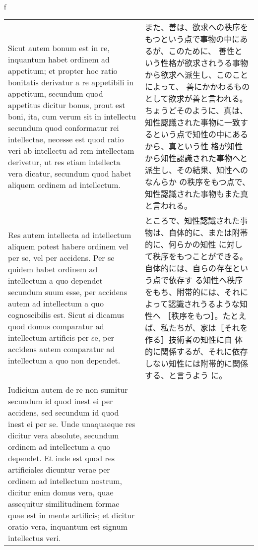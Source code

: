 \\f\documentclass[10pt]{jsarticle} %
\begin{document}
\begin{longtable}{p{21em}p{21em}}
\\


\hspace{1em}Sicut autem bonum est in re, inquantum habet ordinem ad
appetitum; et propter hoc ratio bonitatis derivatur a re appetibili in
appetitum, secundum quod appetitus dicitur bonus, prout est boni, ita,
cum verum sit in intellectu secundum quod conformatur rei intellectae,
necesse est quod ratio veri ab intellectu ad rem intellectam derivetur,
ut res etiam intellecta vera dicatur, secundum quod habet aliquem
ordinem ad intellectum. 


&

また、善は、欲求への秩序をもつという点で事物の中にあるが、このために、
 善性という性格が欲求されうる事物から欲求へ派生し、このことによって、
 善にかかわるものとして欲求が善と言われる。ちょうどそのように、真は、
 知性認識された事物に一致するという点で知性の中にあるから、真という性
 格が知性から知性認識された事物へと派生し、その結果、知性へのなんらか
 の秩序をもつ点で、知性認識された事物もまた真と言われる。


\\

\hspace{1em}Res autem intellecta ad intellectum aliquem potest habere
ordinem vel per se, vel per accidens. Per se quidem habet ordinem ad
intellectum a quo dependet secundum suum esse, per accidens autem ad
intellectum a quo cognoscibilis est. Sicut si dicamus quod domus
comparatur ad intellectum artificis per se, per accidens autem
comparatur ad intellectum a quo non dependet.


&

ところで、知性認識された事物は、自体的に、または附帯的に、何らかの知性
に対して秩序をもつことができる。自体的には、自らの存在という点で依存す
る知性へ秩序をもち、附帯的には、それによって認識されうるような知性へ
［秩序をもつ］。たとえば、私たちが、家は［それを作る］技術者の知性に自
体的に関係するが、それに依存しない知性には附帯的に関係する、と言うよう
に。


\\


Iudicium autem de re non sumitur secundum id quod inest ei per
accidens, sed secundum id quod inest ei per se. Unde unaquaeque res
dicitur vera absolute, secundum ordinem ad intellectum a quo
dependet. Et inde est quod res artificiales dicuntur verae per ordinem
ad intellectum nostrum, dicitur enim domus vera, quae assequitur
similitudinem formae quae est in mente artificis; et dicitur oratio
vera, inquantum est signum intellectus veri.


\end{longtable}
\end{document}
